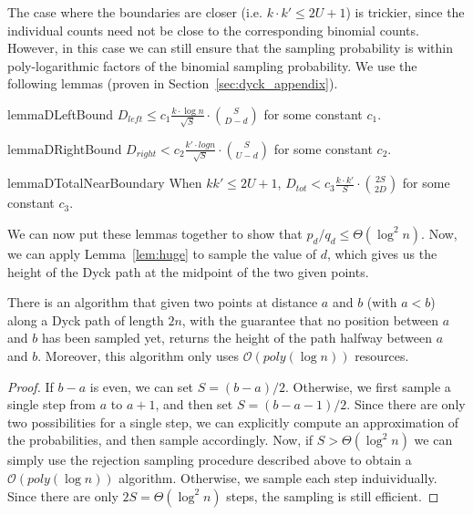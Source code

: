 The case where the boundaries are closer (i.e. $k\cdot k' \le 2U+1$) is trickier,
since the individual counts need not be close to the corresponding binomial counts.
However, in this case we can still ensure that the sampling probability is within
poly-logarithmic factors of the binomial sampling probability.
We use the following lemmas (proven in Section~\ref{sec:dyck_appendix}).

\begin{restatable}{lemma}{DLeftBound}
\label{lem:DLeftBound}
$D_{left} \le c_1 \frac{ k\cdot\log n}{\sqrt{S}}\cdot{{S}\choose{D-d}}$ for some constant $c_1$.
\end{restatable}

\begin{restatable}{lemma}{DRightBound}
\label{lem:DRightBound}
$D_{right} < c_2 \frac{k'\cdot log n}{\sqrt{S}}\cdot{{S}\choose{U-d}}$ for some constant $c_2$.
\end{restatable}

\begin{restatable}{lemma}{DTotalNearBoundary}
\label{lem:DTotalNearBoundary}
When $kk' \le 2U + 1$, $D_{tot} < c_3 \frac{k\cdot k'}{S}\cdot{{2S}\choose{2D}}$ for some constant $c_3$.
\end{restatable}

We can now put these lemmas together to show that $p_d/q_d \le \Theta(\log^2 n)$.
Now, we can apply Lemma~\ref{lem:huge} to sample the value of $d$,
which gives us the height of the Dyck path at the midpoint of the two given points.

\begin{theorem}
\label{thm:dyck_midpoint_sampling}
There is an algorithm that given two points at distance $a$ and $b$ (with $a < b$) along a Dyck path of length $2n$,
with the guarantee that no position between $a$ and $b$ has been sampled yet,
returns the height of the path halfway between $a$ and $b$.
Moreover, this algorithm only uses $\mathcal O(poly(\log n))$ resources.
\end{theorem}
\begin{proof}
If $b-a$ is even, we can set $S = (b-a)/2$.
Otherwise, we first sample a single step from $a$ to $a+1$, and then set $S = (b-a-1)/2$.
Since there are only two possibilities for a single step,
we can explicitly compute an approximation of the probabilities, and then sample accordingly.
Now, if $S > \Theta(\log^2 n)$ we can simply use the rejection sampling procedure described above
to obtain a $\mathcal O(poly(\log n))$ algorithm.
Otherwise, we sample each step induividually.
Since there are only $2S = \Theta(\log^2 n)$ steps, the sampling is still efficient.
\end{proof}

